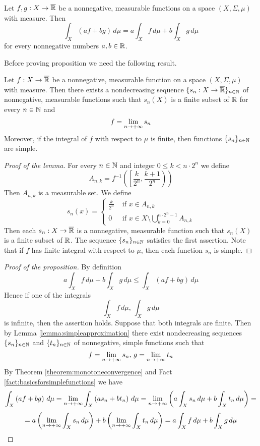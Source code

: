 \begin{proposition}\label{proposition:integralislinear}
Let $f,g:X\rightarrow \overline{{\mathbb R}}$ be a nonnegative, measurable functions on a space $(X,\Sigma,\mu)$ with measure. Then
$$\int_X\left(a f+b  g\right)\,d\mu = a \int_Xf\,d\mu + b \int_Xg\,d\mu$$
for every nonnegative numbers $a, b\in {\mathbb R}$.
\end{proposition}
\noindent
Before proving proposition we need the following result.

\begin{lemma}\label{lemma:simpleapproximation}
Let $f:X\rightarrow \overline{{\mathbb R}}$ be a nonnegative, measurable function on a space $(X,\Sigma,\mu)$ with measure. Then there exists a nondecreasing sequence $\{s_n:X\rightarrow \overline{{\mathbb R}}\}_{n\in {\mathbb N}}$ of nonnegative, measurable functions such that $s_n(X)$ is a finite subset of ${\mathbb R}$ for every $n\in {\mathbb N}$ and
$$f = \lim_{n\rightarrow +\infty}s_n$$
Moreover, if the integral of $f$ with respect to $\mu$ is finite, then functions $\{s_n\}_{n\in {\mathbb N}}$ are simple.
\end{lemma}
\begin{proof}[Proof of the lemma]
For every $n\in {\mathbb N}$ and integer $0\leq k< n\cdot 2^n$ we define 
$$A_{n,k}=f^{-1}\left(\left[\frac{k}{2^n},\frac{k+1}{2^n}\right)\right)$$
Then $A_{n,k}$ is a measurable set. We define
$$s_n(x)=\begin{cases}\frac{k}{2^n}& \mbox{ if } x\in A_{n,k}\\
0& \mbox{ if } x\in X\setminus \bigcup_{k=0}^{n\cdot 2^n-1}A_{n,k}
\end{cases}$$
Then each $s_n:X\rightarrow \overline{{\mathbb R}}$ is a nonnegative, measurable function such that $s_n(X)$ is a finite subset of ${\mathbb R}$. The sequence $\{s_n\}_{n\in {\mathbb N}}$ satisfies the first assertion. Note that if $f$ has finite integral with respect to $\mu$, then each function $s_n$ is simple.
\end{proof}

\begin{proof}[Proof of the proposition]
By definition
$$a \int_Xf\,d\mu + b \int_Xg\,d\mu \leq \int_X\left(a f+b  g\right)\,d\mu $$
Hence if one of the integrals
$$\int_Xf\,d\mu,\,\int_Xg\,d\mu$$
is infinite, then the assertion holds. Suppose that both integrals are finite. Then by Lemma \ref{lemma:simpleapproximation} there exist nondecreasing sequences $\{s_n\}_{n\in {\mathbb N}}$ and $\{t_n\}_{n\in {\mathbb N}}$ of nonnegative, simple functions such that
$$f = \lim_{n\rightarrow +\infty}s_n,\,g=\lim_{n\rightarrow +\infty}t_n$$
By Theorem \ref{theorem:monotoneconvergence} and Fact \ref{fact:basicsforsimplefunctions} we have
$$\int_X\left(a f + b g\right)\,d\mu = \lim_{n\rightarrow +\infty}\int_X\left(a s_n + b t_n\right)\,d\mu = \lim_{n\rightarrow +\infty}\left(a \int_Xs_n\,d\mu + b \int_Xt_n\,d\mu\right) =$$
$$=a  \left(\lim_{n\rightarrow +\infty}\int_Xs_n\,d\mu\right) + b \left(\lim_{n\rightarrow +\infty}\int_Xt_n\,d\mu\right) = a \int_Xf\,d\mu + b \int_Xg\,d\mu$$
\end{proof}

